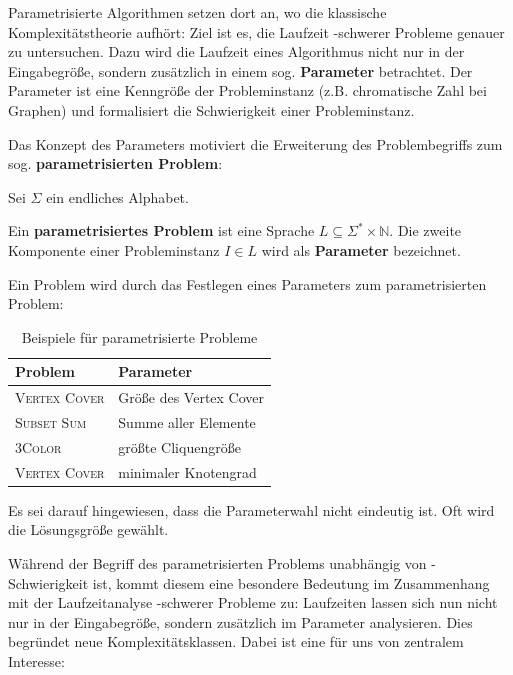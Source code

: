 \documentclass[a4paper,ngerman]{atseminar}
\newcommand{\N}{\ensuremath{\mathbb{N}}\xspace}
\begin{document}
Parametrisierte Algorithmen setzen dort an, wo die klassische Komplexitätstheorie aufhört: Ziel ist es, die Laufzeit \NP-schwerer Probleme
genauer zu untersuchen.
Dazu wird die Laufzeit eines Algorithmus nicht nur in der Eingabegröße, sondern zusätzlich in einem sog. \textbf{Parameter} betrachtet.
Der Parameter ist eine Kenngröße der Probleminstanz (z.B. chromatische Zahl bei Graphen) und formalisiert die Schwierigkeit einer Probleminstanz.

\noindent
Das Konzept des Parameters motiviert die Erweiterung des Problembegriffs zum sog. \textbf{parametrisierten Problem}:

\begin{definition}
  Sei $\Sigma$ ein endliches Alphabet.

  \noindent
  Ein \textbf{parametrisiertes Problem} ist eine Sprache $L \subseteq \Sigma^* \times \N$.
  \noindent
  Die zweite Komponente einer Probleminstanz $I \in L$ wird als \textbf{Parameter} bezeichnet.
\end{definition}

\noindent
Ein Problem wird durch das Festlegen eines Parameters zum parametrisierten Problem:

\begin{table}[h]
  \centering
  \caption{Beispiele für parametrisierte Probleme}
  \begin{tabular}{ll}
    \hline
    \textbf{Problem} & \textbf{Parameter} \\
    \hline
    \textsc{Vertex Cover} & Größe des Vertex Cover \\
    \hline
    \textsc{Subset Sum} & Summe aller Elemente \\
    \hline
    \textsc{3Color} & größte Cliquengröße \\
    \hline
    \textsc{Vertex Cover} &  minimaler Knotengrad \\
    \hline
    
  \end{tabular}
  \end{table}

\noindent
Es sei darauf hingewiesen, dass die Parameterwahl nicht eindeutig ist. Oft wird die Lösungsgröße gewählt.

\noindent
Während der Begriff des parametrisierten Problems unabhängig von \NP-Schwierigkeit ist, kommt diesem eine besondere
Bedeutung im Zusammenhang mit der Laufzeitanalyse \NP-schwerer Probleme zu: Laufzeiten lassen sich nun nicht nur in der Eingabegröße, sondern zusätzlich
im Parameter analysieren.
Dies begründet neue Komplexitätsklassen. Dabei ist eine für uns von zentralem Interesse:
\end{document}
